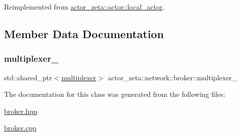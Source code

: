 Reimplemented from \hyperlink{classactor__zeta_1_1actor_1_1local__actor_ab540625b83fa06318a2ae41dcca4ca16}{actor\+\_\+zeta\+::actor\+::local\+\_\+actor}.



\subsection{Member Data Documentation}
\mbox{\label{classactor__zeta_1_1network_1_1broker_aa073d9150fc257a4f39e9571f34d3686}} 
\subsubsection{\texorpdfstring{multiplexer\+\_\+}{multiplexer\_}}
{\footnotesize\ttfamily std\+::shared\+\_\+ptr$<$\hyperlink{structactor__zeta_1_1network_1_1multiplexer}{multiplexer}$>$ actor\+\_\+zeta\+::network\+::broker\+::multiplexer\+\_\+\hspace{0.3cm}{\ttfamily [protected]}}



The documentation for this class was generated from the following files\+:\begin{DoxyCompactItemize}
\item 
\hyperlink{broker_8hpp}{broker.\+hpp}\item 
\hyperlink{broker_8cpp}{broker.\+cpp}\end{DoxyCompactItemize}
